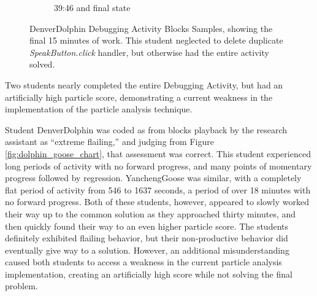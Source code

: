 \begin{figure}
\begin{subfigure}{.45\textwidth}
		\caption{39:46 and final state}
	\end{subfigure}

	\caption[DenverDolphin Debugging Activity Blocks Samples]{DenverDolphin Debugging Activity Blocks Samples, showing the final 15 minutes of work. This student neglected to delete duplicate \emph{SpeakButton.click} handler, but otherwise had the entire activity solved.}
	\label{fig:dolphin_blocks}
\end{figure}

Two students nearly completed the entire Debugging Activity, but had an artificially high particle score, demonstrating a current weakness in the implementation of the particle analysis technique. 

Student DenverDolphin was coded as from blocks playback by the research assistant as ``extreme flailing,'' and judging from Figure \ref{fig:dolphin_goose_chart}, that assessment was correct. This student experienced long periods of activity with no forward progress, and many points of momentary progress followed by regression. YanchengGoose was similar, with a completely flat period of activity from 546 to 1637 seconds, a period of over 18 minutes with no forward progress. Both of these students, however, appeared to slowly worked their way up to the common solution as they approached thirty minutes, and then quickly found their way to an even higher particle score. The students definitely exhibited flailing behavior, but their non-productive behavior did eventually give way to a solution. However, an additional misunderstanding caused both students to access a weakness in the current particle analysis implementation, creating an artificially high score while not solving the final problem.


